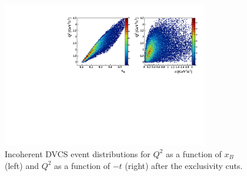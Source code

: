 \documentclass[twocolumn,nofootinbib,showpacs,prl,superscriptaddress,secnumarabic,amssymb,nobibnotes,aps,floatfix]{revtex4}
\begin{document}
\begin{figure}[tb]
\hspace{-0.45cm}
\includegraphics[width=9.0cm]{figs/Q2_xB_t_InCoh.pdf}
\caption{Incoherent DVCS event distributions for $Q^{2}$ as a function of 
$x_{B}$ (left) and $Q^{2}$ as a function of $-t$ (right) after the exclusivity 
cuts.}
\label{fig:kin-coverage}
\end{figure}

\end{document}
